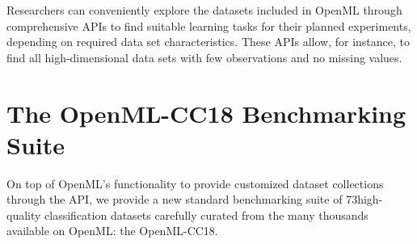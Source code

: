 \documentclass[twoside,11pt]{article}
\newcommand{\numdatasets}{73}
\begin{document}
Researchers can conveniently explore the datasets included in OpenML through comprehensive APIs to find suitable learning tasks for their planned experiments, depending on required data set characteristics. These APIs allow, for instance, to find all high-dimensional data sets with few observations and no missing values.


\section{The OpenML-CC18 Benchmarking Suite}

On top of OpenML's 
functionality to provide customized dataset collections through the API, we provide a new standard benchmarking
suite of \numdatasets high-quality classification datasets carefully curated from the many thousands available on OpenML: the OpenML-CC18.
\end{document}
